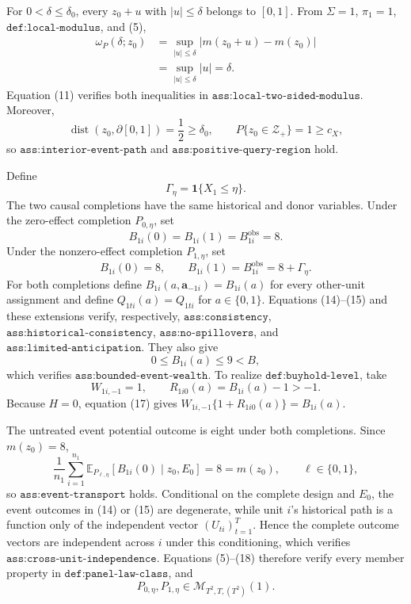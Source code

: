 For \(0<\delta\le\delta_0\), every \(z_0+u\) with \(|u|\le\delta\) belongs to \([0,1]\).  From \(\Sigma=1\), \(\pi_1=1\), \(\texttt{def:local-modulus}\), and (5),
\[
\begin{aligned}
\omega_P(\delta;z_0)
&=\sup_{|u|\le\delta}|m(z_0+u)-m(z_0)|\\
&=\sup_{|u|\le\delta}|u|
=\delta.
\end{aligned}
\tag{11}
\]
Equation (11) verifies both inequalities in \(\texttt{ass:local-two-sided-modulus}\).  Moreover,
\[
\operatorname{dist}(z_0,\partial[0,1])=\frac12\ge\delta_0,
\qquad
P\{z_0\in\mathcal Z_+\}=1\ge c_X,
\tag{12}
\]
so \(\texttt{ass:interior-event-path}\) and \(\texttt{ass:positive-query-region}\) hold.

Define
\[
\Gamma_\eta=\mathbf 1\{X_1\le\eta\}.
\tag{13}
\]
The two causal completions have the same historical and donor variables.  Under the zero-effect completion \(P_{0,\eta}\), set
\[
B_{1i}(0)=B_{1i}(1)=B_{1i}^{\mathrm{obs}}=8.
\tag{14}
\]
Under the nonzero-effect completion \(P_{1,\eta}\), set
\[
B_{1i}(0)=8,
\qquad
B_{1i}(1)=B_{1i}^{\mathrm{obs}}=8+\Gamma_\eta.
\tag{15}
\]
For both completions define \(B_{1i}(a,\mathbf a_{-1i})=B_{1i}(a)\) for every other-unit assignment and define \(Q_{1ti}(a)=Q_{1ti}\) for \(a\in\{0,1\}\).  Equations (14)--(15) and these extensions verify, respectively, \(\texttt{ass:consistency}\), \(\texttt{ass:historical-consistency}\), \(\texttt{ass:no-spillovers}\), and \(\texttt{ass:limited-anticipation}\).  They also give
\[
0\le B_{1i}(a)\le9<B,
\tag{16}
\]
which verifies \(\texttt{ass:bounded-event-wealth}\).  To realize \(\texttt{def:buyhold-level}\), take
\[
W_{1i,-1}=1,
\qquad
R_{1i0}(a)=B_{1i}(a)-1>-1.
\tag{17}
\]
Because \(H=0\), equation (17) gives \(W_{1i,-1}\{1+R_{1i0}(a)\}=B_{1i}(a)\).

The untreated event potential outcome is eight under both completions.  Since \(m(z_0)=8\),
\[
\frac1{n_1}\sum_{i=1}^{n_1}
\mathbb E_{P_{\ell,\eta}}[B_{1i}(0)\mid z_0,E_0]
=8=m(z_0),
\qquad \ell\in\{0,1\},
\tag{18}
\]
so \(\texttt{ass:event-transport}\) holds.  Conditional on the complete design and \(E_0\), the event outcomes in (14) or (15) are degenerate, while unit \(i\)'s historical path is a function only of the independent vector \((U_{ti})_{t=1}^{T}\).  Hence the complete outcome vectors are independent across \(i\) under this conditioning, which verifies \(\texttt{ass:cross-unit-independence}\).  Equations (5)--(18) therefore verify every member property in \(\texttt{def:panel-law-class}\), and
\[
P_{0,\eta},P_{1,\eta}
\in\mathcal M_{T^2,T,(T^2)}(1).
\tag{19}
\]

